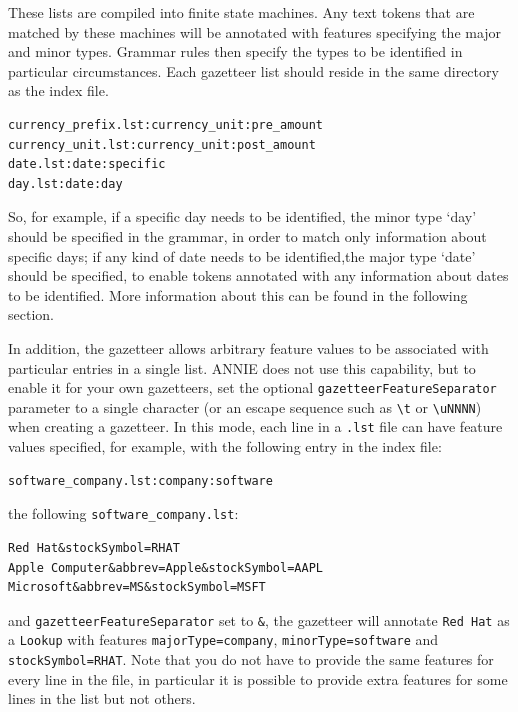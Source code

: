These lists are compiled into finite state machines. Any text tokens
that are matched by these machines will be annotated with features
specifying the major and minor types. Grammar rules then specify
the types to be identified in particular circumstances. Each 
gazetteer list should reside in the same directory as the index 
file.

\begin{small}
\begin{verbatim}
currency_prefix.lst:currency_unit:pre_amount
currency_unit.lst:currency_unit:post_amount
date.lst:date:specific
day.lst:date:day
\end{verbatim}
\end{small}

So, for example, if a specific day needs to be identified, the minor
type `day' should be specified in the grammar, in order to match 
only information about specific days; if any kind of date needs to be
identified,the major type `date' should be specified, to enable tokens
annotated with any information about dates to be identified. More
information about this can be found in the following section.

In addition, the gazetteer allows arbitrary feature values to be associated
with particular entries in a single list.  ANNIE does not use this capability,
but to enable it for your own gazetteers, set the optional
{\tt gazetteerFeatureSeparator} parameter to a single character (or an escape
sequence such as \verb|\t| or \verb|\uNNNN|) when creating a gazetteer.  In
this mode, each line in a {\tt .lst} file can have feature values specified,
for example, with the following entry in the index file:
\begin{small}\begin{verbatim}
software_company.lst:company:software
\end{verbatim}\end{small}
%
the following \verb|software_company.lst|:
\begin{small}\begin{verbatim}
Red Hat&stockSymbol=RHAT
Apple Computer&abbrev=Apple&stockSymbol=AAPL
Microsoft&abbrev=MS&stockSymbol=MSFT
\end{verbatim}\end{small}
%
and {\tt gazetteerFeatureSeparator} set to \verb|&|, the gazetteer will
annotate \verb|Red Hat| as a \verb|Lookup| with features
\verb|majorType=company|, \verb|minorType=software| and
\verb|stockSymbol=RHAT|.  Note that you do not have to provide the same
features for every line in the file, in particular it is possible to provide
extra features for some lines in the list but not others.

